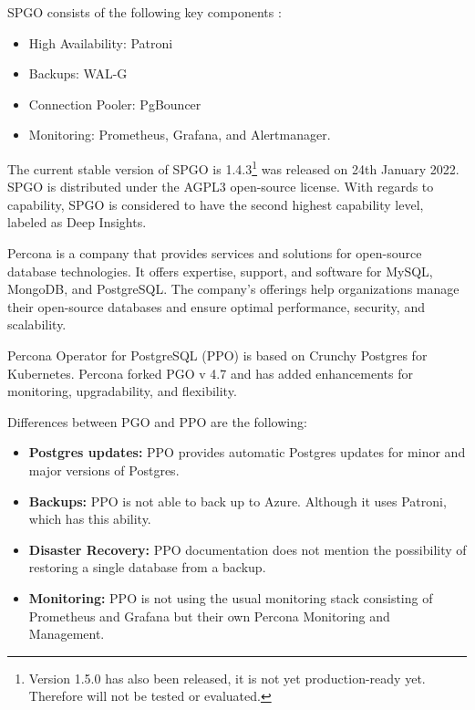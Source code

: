SPGO consists of the following key components \cite{PostgresOnKubernetes}:
\begin{itemize}
    \item High Availability: Patroni
    \item Backups: WAL-G
    \item Connection Pooler: PgBouncer
    \item Monitoring: Prometheus, Grafana, and Alertmanager.
\end{itemize}


The current stable version of SPGO is 1.4.3\footnote[3]{Version 1.5.0 has also been released, it is not yet production-ready yet. Therefore will not be tested or evaluated.} was released on 24th January 2022. \cite{SPGOgitlabChangelog} SPGO is distributed under the AGPL3 open-source license. \cite{SPGODocuLicence}
With regards to capability, SPGO is considered to have the second highest capability level, labeled as Deep Insights. \cite{OperatorHubStackgres}

\label{chap:ppo}

Percona is a company that provides services and solutions for open-source database technologies. It offers expertise, support, and software for MySQL, MongoDB, and PostgreSQL. The company's offerings help organizations manage their open-source databases and ensure optimal performance, security, and scalability. \cite{Percona}

Percona Operator for PostgreSQL (PPO) is based on Crunchy Postgres for Kubernetes. Percona forked PGO v 4.7 and has added enhancements for monitoring, upgradability, and flexibility. \cite{PerconaBlogProsAndCons}

Differences between PGO and PPO are the following:
\begin{itemize}
    \item \textbf{Postgres updates:} PPO provides automatic Postgres updates for minor and major versions of Postgres.  \cite{PerconaDocuUpdate}
    \item \textbf{Backups:} PPO is not able to back up to Azure. \cite{PerconaDocuCompare} Although it uses Patroni, which has this ability.
    \item \textbf{Disaster Recovery:} PPO documentation does not mention the possibility of restoring a single database from a backup. \cite{PerconaDocuBackups}
    \item \textbf{Monitoring:} PPO is not using the usual monitoring stack consisting of Prometheus and Grafana but their own Percona Monitoring and Management. \cite{PerconaDocuMonitoring}
\end{itemize}


